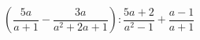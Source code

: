 \begin{ex}[type=expression]
	\begin{condition}
		\(\left( \dfrac{5a}{a+1}-\dfrac{3a}{a^2+2a+1} \right):\dfrac{5a+2}{a^2-1}+\dfrac{a-1}{a+1}\)
	\end{condition}
\end{ex}